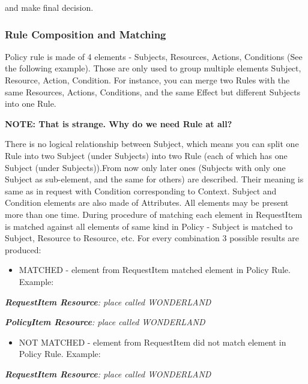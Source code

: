 \documentclass[a4paper]{article}
\newcommand\liststyleWWviiiNumxx{%
\renewcommand\theenumi{\arabic{enumi}}
\renewcommand\theenumii{\arabic{enumii}}
\renewcommand\theenumiii{\arabic{enumiii}}
\renewcommand\labelitemi{o}
\renewcommand\labelenumi{\theenumi.}
\renewcommand\labelenumii{\theenumii.}
\renewcommand\labelenumiii{\theenumiii.}
}
\begin{document}
{\color{black}
and make final decision.}


\bigskip

\subsubsection{Rule Composition and Matching}
{\color{black}
Policy rule is made of 4 elements - Subjects, Resources, Actions,
Conditions (See the following example). Those are only used to group
multiple elements Subject, Resource, Action, Condition. For instance,
you can merge two Rules with the same Resources, Actions, Conditions,
and the same {\textquotedbl}Effect{\textquotedbl} but different
Subjects into one Rule.}

{\bfseries\color{black}
NOTE: That is strange. Why do we need Rule at all?}

{\color{black}
There is no logical relationship between Subject, which means you can
split one Rule into two Subject (under Subjects) into two Rule (each of
which has one Subject (under Subjects)).From now only later ones
(Subjects with only one Subject as sub-element, and the same for
others) are described. Their meaning is same as in request with
Condition corresponding to Context. Subject and Condition elements are
also made of Attributes. All elements may be present more than one
time. During procedure of matching each element in RequestItem is
matched against all elements of same kind in Policy - Subject is
matched to Subject, Resource to Resource, etc. For every combination 3
possible results are produced:}

\liststyleWWviiiNumxx
\begin{itemize}
\item {\color{black}
MATCHED - element from RequestItem matched element in Policy Rule.
Example:}
\end{itemize}
{\upshape\color{black}
\foreignlanguage{english}{\textbf{\textit{RequestItem
Resource}}}\foreignlanguage{english}{\textit{: place called
WONDERLAND}}}

{\upshape\color{black}
\foreignlanguage{english}{\textbf{\textit{PolicyItem
Resource}}}\foreignlanguage{english}{\textit{: place called
WONDERLAND}}}

\liststyleWWviiiNumxx
\begin{itemize}
\item {\color{black}
NOT MATCHED - element from RequestItem did not match element in Policy
Rule. Example:}
\end{itemize}
{\upshape\color{black}
\foreignlanguage{english}{\textbf{\textit{RequestItem
Resource}}}\foreignlanguage{english}{\textit{: place called
WONDERLAND}}}
\end{document}
